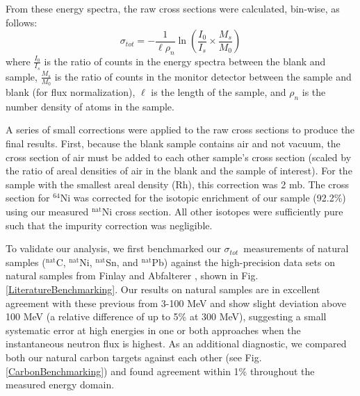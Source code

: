 \documentclass[twocolumn,secnumarabic,amssymb, nobibnotes, aps, prl,
superscriptaddress, nobalancelastpage]{revtex4}
\newcommand{\tot}{\ensuremath{\sigma_{tot}}}
\begin{document}
From these energy spectra, the raw cross sections were calculated, bin-wise, as follows:
$$
\tot = -\frac{1}{\ell\rho_{n}}
\ln \left(\frac{I_{0}}{I_{s}}\times\frac{M_{s}}{M_{0}}\right)
$$
where $\frac{I_{0}}{I_{s}}$ is the ratio of counts in the energy spectra between 
the blank and sample, $\frac{M_{s}}{M_{0}}$ is the ratio of counts in the
monitor detector between the sample and blank (for flux normalization), $\ell$ is the length 
of the sample, and $\rho_{n}$ is the number density of atoms in the sample.

A series of small corrections were applied to the raw cross sections to produce
the final results. First, because the blank sample contains air and not vacuum,
the cross section of air must be added to each other sample's cross section (scaled by  
the ratio of areal densities of air in the blank and the sample of interest).
For the sample with the smallest areal density (Rh), this correction was 2 mb.
The cross section for $^{64}$Ni was corrected for the isotopic enrichment of our
sample (92.2\%) using our measured $^{\text{nat}}$Ni cross section. All other isotopes were 
sufficiently pure such that the impurity correction was negligible.

To validate our analysis, we first benchmarked our \tot\ measurements of natural samples
($^{\text{nat}}$C, $^{\text{nat}}$Ni, $^{\text{nat}}$Sn, and
$^{\text{nat}}$Pb) against the high-precision data sets on natural samples from Finlay
\cite{Finlay1993} and Abfalterer \cite{Abfalterer2001}, shown in Fig.
\ref{LiteratureBenchmarking}. Our results on natural samples are in excellent agreement with 
these previous from 3-100 MeV and show slight deviation above 100 MeV (a
relative difference of up to 5\% at 300 MeV), suggesting a small systematic
error at high energies in one or both approaches when the instantaneous neutron
flux is highest. As an additional diagnostic, we compared 
both our natural carbon targets against each other (see Fig.
\ref{CarbonBenchmarking}) and found agreement within 1\% throughout the measured
energy domain.
\end{document}
